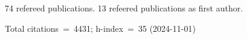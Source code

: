 74 refereed publications. 13 refeered publications as first author.

Total citations~=~4431; h-index~=~35 (2024-11-01)